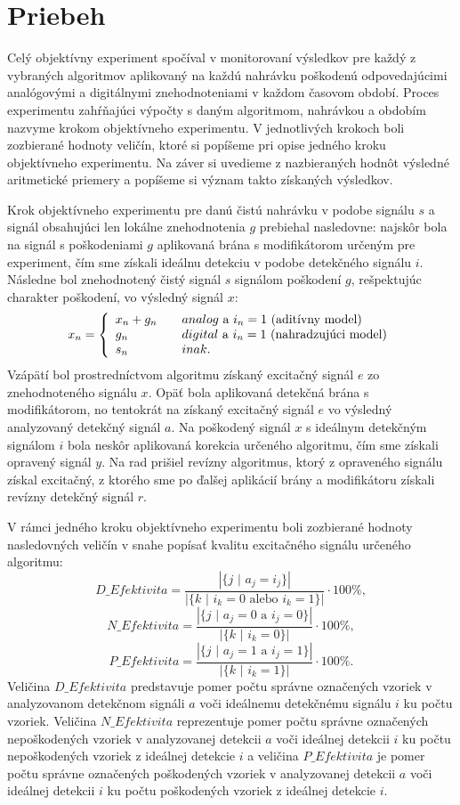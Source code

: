 \section{Priebeh}
Celý objektívny experiment spočíval v monitorovaní výsledkov pre každý z vybraných algoritmov aplikovaný na každú nahrávku poškodenú odpovedajúcimi analógovými a digitálnymi znehodnoteniami v každom časovom období. Proces experimentu zahŕňajúci výpočty s daným algoritmom, nahrávkou a obdobím nazvyme krokom objektívneho experimentu. V jednotlivých krokoch boli zozbierané hodnoty veličín, ktoré si popíšeme pri opise jedného kroku objektívneho experimentu. Na záver si uvedieme z nazbieraných hodnôt výsledné aritmetické priemery a popíšeme si význam takto získaných výsledkov.

Krok objektívneho experimentu pre danú čistú nahrávku v podobe signálu $s$ a signál obsahujúci len lokálne znehodnotenia $g$ prebiehal nasledovne: najskôr bola na signál s poškodeniami $g$ aplikovaná brána s modifikátorom určeným pre experiment, čím sme získali ideálnu detekciu v podobe detekčného signálu $i$. Následne bol znehodnotený čistý signál $s$ signálom poškodení $g$, rešpektujúc charakter poškodení, vo výsledný signál $x$:
$$x_n = \left\{\begin{array}{l l}
	x_n + g_n & \quad \text{$analog$ a $i_n = 1$ (aditívny model)}\\
	g_n & \quad \text{$digital$ a $i_n = 1$ (nahradzujúci model)}\\
	s_n & \quad inak.\\
\end{array} \right.$$
Vzápätí bol prostredníctvom algoritmu získaný excitačný signál $e$ zo znehodnoteného signálu $x$. Opäť bola aplikovaná detekčná brána s modifikátorom, no tentokrát na získaný excitačný signál $e$ vo výsledný analyzovaný detekčný signál $a$. Na poškodený signál $x$ s ideálnym detekčným signálom $i$ bola neskôr aplikovaná korekcia určeného algoritmu, čím sme získali opravený signál $y$. Na rad prišiel revízny algoritmus, ktorý z opraveného signálu získal excitačný, z ktorého sme po ďalšej aplikácií brány a modifikátoru získali revízny detekčný signál $r$.

V rámci jedného kroku objektívneho experimentu boli zozbierané hodnoty nasledovných veličín v snahe popísať kvalitu excitačného signálu určeného algoritmu:
$$D\_Efektivita = \frac{| \{\text{$j$ | $a_j=i_j$} \} |}{| \{\text{$k$ | $i_k=0$ alebo $i_k=1$} \} |} \cdot 100\%,$$
$$N\_Efektivita = \frac{| \{\text{$j$ | $a_j=0$ a $i_j=0$} \} |}{| \{\text{$k$ | $i_k=0$} \} |} \cdot 100\%,$$
$$P\_Efektivita = \frac{| \{\text{$j$ | $a_j=1$ a $i_j=1$} \} |}{| \{\text{$k$ | $i_k=1$} \} |} \cdot 100\%.$$
Veličina $D\_Efektivita$ predstavuje pomer počtu správne označených vzoriek v analyzovanom detekčnom signáli $a$ voči ideálnemu detekčnému signálu $i$ ku počtu vzoriek. Veličina $N\_Efektivita$ reprezentuje pomer počtu správne označených nepoškodených vzoriek v analyzovanej detekcii $a$ voči ideálnej detekcii $i$ ku počtu nepoškodených vzoriek z ideálnej detekcie $i$ a veličina $P\_Efektivita$ je pomer počtu správne označených poškodených vzoriek v analyzovanej detekcii $a$ voči ideálnej detekcii $i$ ku počtu poškodených vzoriek z ideálnej detekcie $i$.

